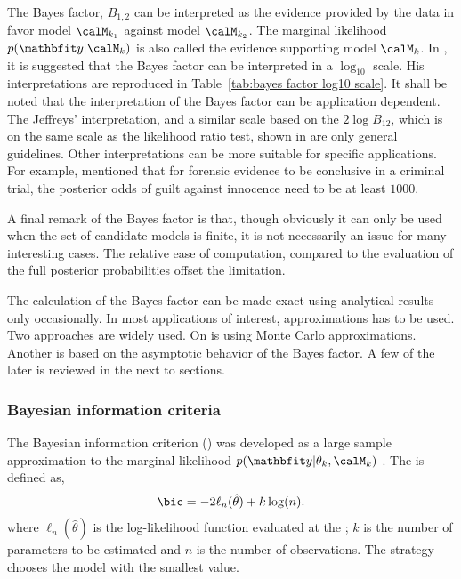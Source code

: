 The Bayes factor, $B_{1,2}$ can be interpreted as the evidence provided by the
data in favor model $\calM_{k_1}$ against model $\calM_{k_2}$. The marginal
likelihood $p(\data|\calM_k)$ is also called the evidence supporting model
$\calM_k$. In \cite{Jeffreys:1961ua}, it is suggested that the Bayes factor
can be interpreted in a $\log_{10}$ scale. His interpretations are reproduced
in Table~\ref{tab:bayes factor log10 scale}. It shall be noted that the
interpretation of the Bayes factor can be application dependent. The Jeffreys'
interpretation, and a similar scale based on the $2\log B_{12}$, which is on
the same scale as the likelihood ratio test, shown in \cite{Kass:1995vb} are
only general guidelines. Other interpretations can be more suitable for
specific applications. For example, \cite{Kass:1995vb} mentioned that for
forensic evidence to be conclusive in a criminal trial, the posterior odds of
guilt against innocence need to be at least $1000$.

A final remark of the Bayes factor is that, though obviously it can only be
used when the set of candidate models is finite, it is not necessarily
an issue for many interesting cases. The relative ease of computation,
compared to the evaluation of the full posterior probabilities offset the
limitation.



The calculation of the Bayes factor can be made exact using analytical results
only occasionally. In most applications of interest, approximations has to be
used. Two approaches are widely used. On is using Monte Carlo approximations.
Another is based on the asymptotic behavior of the Bayes factor. A few of the
later is reviewed in the next to sections.

\subsubsection{Bayesian information criteria}
\label{ssub:Bayesian information criteria}

The Bayesian information criterion (\bic) was developed as a large sample
approximation to the marginal likelihood $p(\data|\theta_k,\calM_k)$
\cite{Schwarz:1978uv}. The \bic is defined as,
\begin{equation}
  \text{\bic} = -2\ell_n(\hat\theta) + k\log(n).
  \label{eq:bic}
\end{equation}
where $\ell_n(\hat\theta)$ is the log-likelihood function evaluated at the
\mle; $k$ is the number of parameters to be estimated and $n$ is the number of
observations. The \bic strategy chooses the model with the smallest \bic
value.

